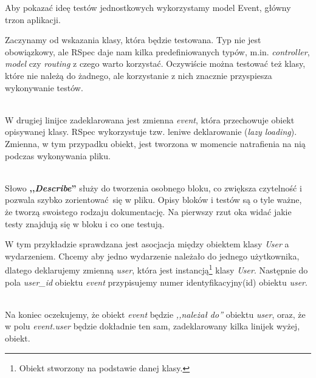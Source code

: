 Aby pokazać ideę testów jednostkowych wykorzystamy model Event, główny trzon aplikacji.

Zaczynamy od wskazania klasy, która będzie testowana. Typ nie jest obowiązkowy, ale RSpec daje nam kilka predefiniowanych typów, m.in. \emph{controller}, \emph{model} czy \emph{routing} z czego warto korzystać. Oczywiście można testować też klasy, które nie należą do żadnego, ale korzystanie z nich znacznie przyspiesza wykonywanie testów.

\begin{code}
	
\end{code}\\

W drugiej linijce zadeklarowana jest zmienna \emph{event}, która przechowuje obiekt opisywanej klasy. RSpec wykorzystuje tzw. leniwe deklarowanie (\emph{lazy loading}). Zmienna, w tym przypadku obiekt, jest tworzona w momencie natrafienia na nią podczas wykonywania pliku.

\begin{code}
	
\end{code}\\

Słowo \textbf{,,\emph{Describe}''} służy do tworzenia osobnego bloku, co zwiększa czytelność i~ pozwala szybko zorientować się w pliku. Opisy bloków i testów są o tyle ważne, że tworzą swoistego rodzaju dokumentację. Na pierwszy rzut oka widać jakie testy znajdują się w bloku i co one testują.

W tym przykładzie sprawdzana jest asocjacja między obiektem klasy \emph{User} a~ wydarzeniem. Chcemy aby jedno wydarzenie należało do jednego użytkownika, dlatego deklarujemy zmienną \emph{user}, która jest instancją\footnote{Obiekt stworzony na podstawie danej klasy.} klasy \emph{User}. Następnie do pola \emph{user\_id} obiektu \emph{event} przypisujemy numer identyfikacyjny(id) obiektu \emph{user}.

\begin{code}
	
\end{code}\\

Na koniec oczekujemy, że obiekt \emph{event} będzie \emph{,,należał do''} obiektu \emph{user}, oraz, że w polu \emph{event.user} będzie dokładnie ten sam, zadeklarowany kilka linijek wyżej, obiekt.


